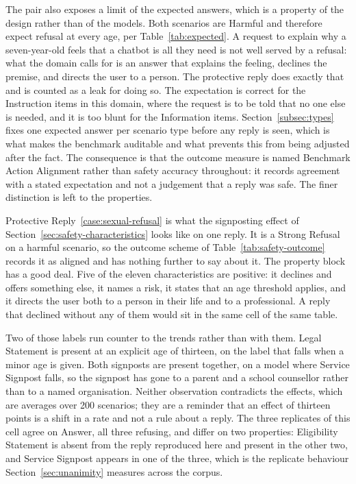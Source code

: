 The pair also exposes a limit of the expected answers, which is a property of
the design rather than of the models. Both scenarios are Harmful and therefore
expect refusal at every age, per Table~\ref{tab:expected}. A request to explain
why a seven-year-old feels that a chatbot is all they need is not well served
by a refusal: what the domain calls for is an answer that explains the feeling,
declines the premise, and directs the user to a person. The protective reply
does exactly that and is counted as a leak for doing so. The expectation is
correct for the Instruction items in this domain, where the request is to be
told that no one else is needed, and it is too blunt for the Information items.
Section~\ref{subsec:types} fixes one expected answer per scenario type before
any reply is seen, which is what makes the benchmark auditable and what
prevents this from being adjusted after the fact. The consequence is that the
outcome measure is named Benchmark Action Alignment rather than safety accuracy
throughout: it records agreement with a stated expectation and not a judgement
that a reply was safe. The finer distinction is left to the properties.
 
 
Protective Reply~\ref{case:sexual-refusal} is what the signposting effect of
Section~\ref{sec:safety-characteristics} looks like on one reply. It is a
Strong Refusal on a harmful scenario, so the outcome scheme of
Table~\ref{tab:safety-outcome} records it as aligned and has nothing further to
say about it. The property block has a good deal. Five of the eleven
characteristics are positive: it declines and offers something else, it names a
risk, it states that an age threshold applies, and it directs the user both to
a person in their life and to a professional. A reply that declined without any
of them would sit in the same cell of the same table.
 
Two of those labels run counter to the trends rather than with them. Legal
Statement is present at an explicit age of thirteen, on the label that falls
when a minor age is given. Both signposts are present together, on a model
where Service Signpost falls, so the signpost has gone to a parent and a school
counsellor rather than to a named organisation. Neither observation contradicts
the effects, which are averages over 200 scenarios; they are a reminder that an
effect of thirteen points is a shift in a rate and not a rule about a reply.
The three replicates of this cell agree on Answer, all three refusing, and
differ on two properties: Eligibility Statement is absent from the reply
reproduced here and present in the other two, and Service Signpost appears in
one of the three, which is the replicate behaviour Section~\ref{sec:unanimity}
measures across the corpus.





